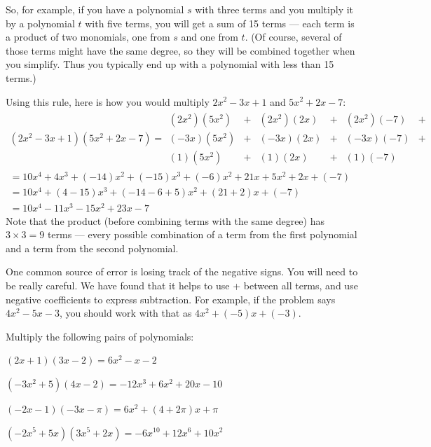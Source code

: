 So, for example, if you have a polynomial $s$ with three terms and you
multiply it by a polynomial $t$ with five terms, you will get a sum of
15 terms --- each term is a product of two monomials, one from $s$ and
one from $t$.  (Of course, several of those terms might have the same
degree, so they will be combined together when you simplify. Thus you
typically end up with a polynomial with less than 15 terms.)

Using this rule, here is how you would multiply $2x^2 - 3x + 1$ and
$5x^2 + 2x - 7$:
\begin{multline*}
  (2x^2 - 3x + 1)(5x^2 + 2x - 7)  = \begin{matrix}
  (2x^2)(5x^2)& + &(2x^2)(2x)& + &(2x^2)(-7)& + \\
  (-3x)(5x^2)& + &(-3x)(2x)& + &(-3x)(-7)& + \\
    (1)(5x^2)& + &(1)(2x)& + &(1)(-7)& 
  \end{matrix} \\
  = 10x^4 + 4x^3 + (-14)x^2 + (-15)x^3 + (-6)x^2 + 21x +5x^2 + 2x + (-7) \\
  = 10x^4 + (4 - 15)x^3 + (-14 - 6 + 5)x^2  + (21 + 2)x + (-7) \\
  = 10x^4 - 11x^3 - 15x^2 + 23x - 7
\end{multline*}
Note that the product (before combining terms with the same degree) has
$3 \times 3 = 9$ terms --- every possible combination of a term from the
first polynomial and a term from the second polynomial.

One common source of error is losing track of the negative
signs. You will need to be really careful. We have found that it
helps to use + between all terms, and use negative coefficients to
express subtraction. For example, if the problem says $4x^2 - 5x - 3$,
you should work with that as $4x^2 + (-5)x + (-3)$.

\begin{Exercise}[title={Multiplying polynomials}, label=multpolys]
  Multiply the following pairs of polynomials:
  \vspace{15mm}
  \vspace{15mm}
  \vspace{15mm}
  \vspace{15mm}

\end{Exercise}
\begin{Answer}[ref=multpolys]
  $(2x + 1)(3x - 2) = 6x^2 - x - 2$

  $(-3x^2 + 5)(4x - 2) = -12x^3 + 6x^2 + 20x - 10$

  $(-2x - 1)(-3x - \pi) = 6x^2 + (4 + 2\pi)x + \pi$ 

  $(-2x^5 + 5x)(3x^5 + 2x) = -6x^{10} + 12x^6 + 10x^2$
\end{Answer}

